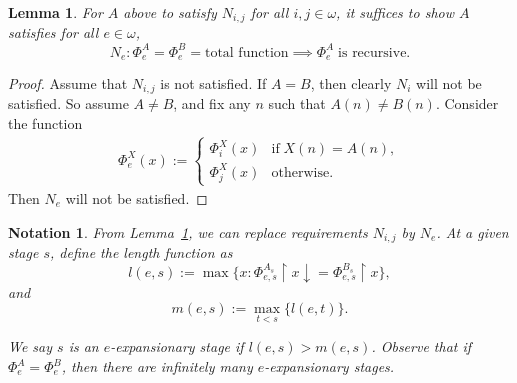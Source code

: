 \documentclass{article}
\newtheorem{notation}{Notation}[subsection]
\newtheorem{lemma}{Lemma}[subsection]
\begin{document}
  \begin{lemma}
    \label{lemma:N}
    For $A$ above to satisfy $N_{i,j}$ for all
    $i,j\in\omega$, it suffices to show $A$ satisfies for all
    $e\in\omega$,
    \begin{equation}
      N_e: \Phi_e^A=\Phi_e^B =\text{total function} \implies \Phi_e^A\;
      \text{is recursive}.
      \label{eqn:cappable2}
    \end{equation}
  \end{lemma}
  \begin{proof}
    Assume that $N_{i,j}$ is not satisfied. If $A=B$, then
    clearly $N_i$ will not be satisfied. So assume $A\neq B$, and fix any
    $n$ such that $A(n)\neq B(n)$. Consider the function
    \begin{align*}
      \Phi_e^X(x) :=
      \begin{cases}
        \Phi_i^X(x) &\text{if}\; X(n)=A(n),\\
        \Phi_j^X(x) &\text{otherwise}.
      \end{cases}
    \end{align*}
    Then $N_e$ will not be satisfied.
  \end{proof}

  \begin{notation}
    From Lemma~\ref{lemma:N}, we can replace requirements $N_{i,j}$ by
    $N_e$. At a given stage $s$, define the length function as
    \[l(e,s) :=\max\{x: \Phi_{e,s}^{A_s}\restriction x
    \downarrow=\Phi_{e,s}^{B_s}\restriction x\},\]
    and
    \[m(e,s) :=\max_{t<s}\{l(e,t)\}.\]
    
    We say $s$ is an \textit{$e$-expansionary} stage if $l(e,s)>m(e,s)$.
    Observe that if $\Phi^A_e=\Phi^B_e$, then there are infinitely many
    $e$-expansionary stages.\\
  \end{notation}
\end{document}
